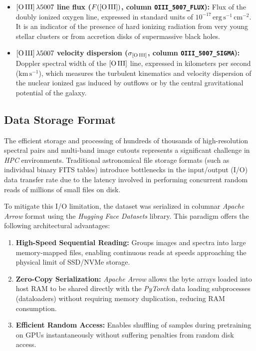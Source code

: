 \begin{itemize}
	\item \textbf{$[\text{O\,III}]\,\lambda 5007$ line flux ($F([\text{O\,III}])$, column \texttt{OIII\_5007\_FLUX}):} Flux of the doubly ionized oxygen line, expressed in standard units of $10^{-17}\,\text{erg}\,\text{s}^{-1}\,\text{cm}^{-2}$. It is an indicator of the presence of hard ionizing radiation from very young stellar clusters or from accretion disks of supermassive black holes.
	
	\item \textbf{$[\text{O\,III}]\,\lambda 5007$ velocity dispersion ($\sigma_{[\text{O\,III}]}$, column \texttt{OIII\_5007\_SIGMA}):} Doppler spectral width of the $[\text{O\,III}]$ line, expressed in kilometers per second ($\text{km}\,\text{s}^{-1}$), which measures the turbulent kinematics and velocity dispersion of the nuclear ionized gas induced by outflows or by the central gravitational potential of the galaxy.
\end{itemize}

\subsection{Data Storage Format}

The efficient storage and processing of hundreds of thousands of high-resolution spectral pairs and multi-band image cutouts represents a significant challenge in \textit{\gls{HPC}} environments. Traditional astronomical file storage formats (such as individual binary FITS tables) introduce bottlenecks in the input/output (I/O) data transfer rate due to the latency involved in performing concurrent random reads of millions of small files on disk.

To mitigate this I/O limitation, the dataset was serialized in columnar \textit{Apache Arrow} format using the \textit{Hugging Face Datasets} library. This paradigm offers the following architectural advantages:

\begin{enumerate}
	\item \textbf{High-Speed Sequential Reading:} Groups images and spectra into large memory-mapped files, enabling continuous reads at speeds approaching the physical limit of SSD/NVMe storage.
	\item \textbf{Zero-Copy Serialization:} \textit{Apache Arrow} allows the byte arrays loaded into host RAM to be shared directly with the \textit{PyTorch} data loading subprocesses (dataloaders) without requiring memory duplication, reducing RAM consumption.
	\item \textbf{Efficient Random Access:} Enables shuffling of samples during pretraining on \glspl{GPU} instantaneously without suffering penalties from random disk access.
\end{enumerate}

